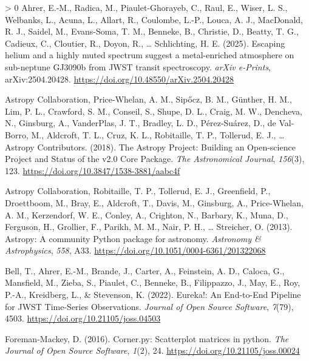 \documentclass[10pt,a4paper,onecolumn]{article}
\newlength{\cslhangindent}
\newenvironment{CSLReferences}[3] %
 {%
  \setlength{\parindent}{0pt}
  \ifodd #1 \everypar{\setlength{\hangindent}{\cslhangindent}}\ignorespaces\fi
  \ifnum #2 > 0
  \setlength{\parskip}{#2\baselineskip}
  \fi
 }%
 {}
\begin{document}
\hypertarget{refs}{}
\begin{CSLReferences}{1}{0}
\leavevmode\hypertarget{ref-Ahrer:2025}{}%
Ahrer, E.-M., Radica, M., Piaulet-Ghorayeb, C., Raul, E., Wiser, L. S.,
Welbanks, L., Acuna, L., Allart, R., Coulombe, L.-P., Louca, A. J.,
MacDonald, R. J., Saidel, M., Evans-Soma, T. M., Benneke, B., Christie,
D., Beatty, T. G., Cadieux, C., Cloutier, R., Doyon, R., \ldots{}
Schlichting, H. E. (2025). Escaping helium and a highly muted spectrum
suggest a metal-enriched atmosphere on sub-neptune GJ3090b from JWST
transit spectroscopy. \emph{arXiv e-Prints}, arXiv:2504.20428.
\url{https://doi.org/10.48550/arXiv.2504.20428}

\leavevmode\hypertarget{ref-astropy:2018}{}%
Astropy Collaboration, Price-Whelan, A. M., Sipőcz, B. M., Günther, H.
M., Lim, P. L., Crawford, S. M., Conseil, S., Shupe, D. L., Craig, M.
W., Dencheva, N., Ginsburg, A., VanderPlas, J. T., Bradley, L. D.,
Pérez-Suárez, D., de Val-Borro, M., Aldcroft, T. L., Cruz, K. L.,
Robitaille, T. P., Tollerud, E. J., \ldots{} Astropy Contributors.
(2018). {The Astropy Project: Building an Open-science Project and
Status of the v2.0 Core Package}. \emph{The Astronomical Journal},
\emph{156}(3), 123. \url{https://doi.org/10.3847/1538-3881/aabc4f}

\leavevmode\hypertarget{ref-astropy:2013}{}%
Astropy Collaboration, Robitaille, T. P., Tollerud, E. J., Greenfield,
P., Droettboom, M., Bray, E., Aldcroft, T., Davis, M., Ginsburg, A.,
Price-Whelan, A. M., Kerzendorf, W. E., Conley, A., Crighton, N.,
Barbary, K., Muna, D., Ferguson, H., Grollier, F., Parikh, M. M., Nair,
P. H., \ldots{} Streicher, O. (2013). {Astropy: A community Python
package for astronomy}. \emph{Astronomy \& Astrophysics}, \emph{558},
A33. \url{https://doi.org/10.1051/0004-6361/201322068}

\leavevmode\hypertarget{ref-bell_eureka_2022}{}%
Bell, T., Ahrer, E.-M., Brande, J., Carter, A., Feinstein, A. D.,
Caloca, G., Mansfield, M., Zieba, S., Piaulet, C., Benneke, B.,
Filippazzo, J., May, E., Roy, P.-A., Kreidberg, L., \& Stevenson, K.
(2022). {Eureka!: An End-to-End Pipeline for JWST Time-Series
Observations}. \emph{Journal of Open Source Software}, \emph{7}(79),
4503. \url{https://doi.org/10.21105/joss.04503}

\leavevmode\hypertarget{ref-corner}{}%
Foreman-Mackey, D. (2016). Corner.py: Scatterplot matrices in python.
\emph{The Journal of Open Source Software}, \emph{1}(2), 24.
\url{https://doi.org/10.21105/joss.00024}


\end{CSLReferences}
\end{document}
